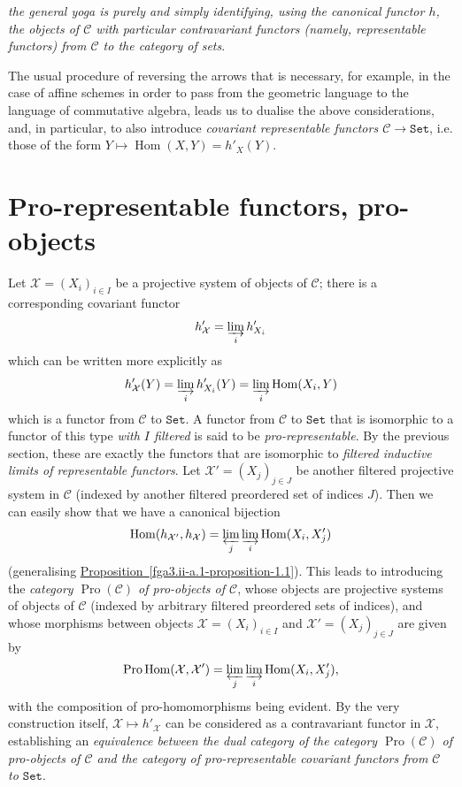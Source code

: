   \emph{the general yoga is purely and simply identifying, using the canonical functor \(h\), the objects of \(\mathcal {C}\) with particular contravariant functors (namely, representable functors) from \(\mathcal {C}\) to the category of sets}.\par{}The usual procedure of reversing the arrows that is necessary, for example, in the case of affine schemes in order to pass from the geometric language to the language of commutative algebra, leads us to dualise the above considerations, and, in particular, to also introduce \emph{covariant representable functors \(\mathcal {C}\to \mathtt {Set}\)}, i.e. those of the form \(Y\mapsto \operatorname {Hom}(X,Y)=h'_X(Y)\).\section{Pro-representable functors, pro-objects}\label{fga3.ii-a.2}\par{}Let \(\mathcal {X}=(X_i)_{i\in  I}\) be a projective system of objects of \(\mathcal {C}\);
  there is a corresponding covariant functor
  \[     h'_{\mathcal {X}}     = \varinjlim _i h'_{X_i}   \]
  which can be written more explicitly as
  \[     h'_{\mathcal {X}}(Y)     = \varinjlim _i h'_{X_i}(Y)     = \varinjlim _i\operatorname {Hom}(X_i,Y)   \]
  which is a functor from \(\mathcal {C}\) to \(\mathtt {Set}\).
  A functor from \(\mathcal {C}\) to \(\mathtt {Set}\) that is isomorphic to a functor of this type \emph{with \(I\) filtered} is said to be \emph{pro-representable}.
  By the previous section, these are exactly the functors that are isomorphic to \emph{filtered inductive limits of representable functors}.
  Let \(\mathcal {X}'=(X_j)_{j\in  J}\) be another filtered projective system in \(\mathcal {C}\) (indexed by another filtered preordered set of indices \(J\)).
  Then we can easily show that we have a canonical bijection
  \[     \operatorname {Hom}(h_{\mathcal {X}'},h_{\mathcal {X}})     = \varprojlim _j\varinjlim _i\operatorname {Hom}(X_i,X'_j)   \]
  (generalising \hyperref[fga3.ii-a.1-proposition-1.1]{Proposition~\ref*{fga3.ii-a.1-proposition-1.1}}).
  This leads to introducing the \emph{category \(\operatorname {Pro}(\mathcal {C})\) of pro-objects of \(\mathcal {C}\)}, whose objects are projective systems of objects of \(\mathcal {C}\) (indexed by arbitrary filtered preordered sets of indices), and whose morphisms between objects \(\mathcal {X}=(X_i)_{i\in  I}\) and \(\mathcal {X}'=(X_j)_{j\in  J}\) are given by
  \[     \operatorname {Pro}\operatorname {Hom}(\mathcal {X},\mathcal {X}')     = \varprojlim _j\varinjlim _i\operatorname {Hom}(X_i,X'_j),   \]
  with the composition of pro-homomorphisms being evident.
  By the very construction itself, \(\mathcal {X}\mapsto  h'_{\mathcal {X}}\) can be considered as a contravariant functor in \(\mathcal {X}\), establishing an \emph{equivalence between the dual category of the category \(\operatorname {Pro}(\mathcal {C})\) of pro-objects of \(\mathcal {C}\) and the category of pro-representable covariant functors from \(\mathcal {C}\) to \(\mathtt {Set}\)}.
  
